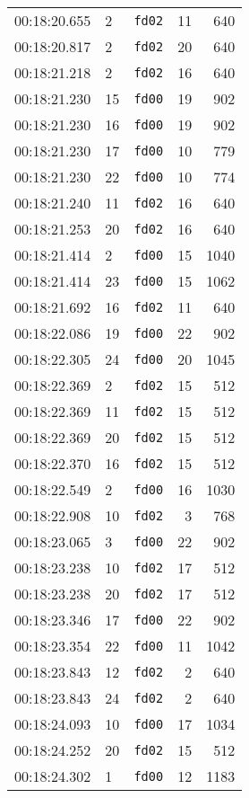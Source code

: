 \documentclass{article}
\begin{document}
\begin{longtable}{lllrr}
00:18:20.655 & 2 & \texttt{fd02} & 11 & 640 \\
00:18:20.817 & 2 & \texttt{fd02} & 20 & 640 \\
00:18:21.218 & 2 & \texttt{fd02} & 16 & 640 \\
00:18:21.230 & 15 & \texttt{fd00} & 19 & 902 \\
00:18:21.230 & 16 & \texttt{fd00} & 19 & 902 \\
00:18:21.230 & 17 & \texttt{fd00} & 10 & 779 \\
00:18:21.230 & 22 & \texttt{fd00} & 10 & 774 \\
00:18:21.240 & 11 & \texttt{fd02} & 16 & 640 \\
00:18:21.253 & 20 & \texttt{fd02} & 16 & 640 \\
00:18:21.414 & 2 & \texttt{fd00} & 15 & 1040 \\
00:18:21.414 & 23 & \texttt{fd00} & 15 & 1062 \\
00:18:21.692 & 16 & \texttt{fd02} & 11 & 640 \\
00:18:22.086 & 19 & \texttt{fd00} & 22 & 902 \\
00:18:22.305 & 24 & \texttt{fd00} & 20 & 1045 \\
00:18:22.369 & 2 & \texttt{fd02} & 15 & 512 \\
00:18:22.369 & 11 & \texttt{fd02} & 15 & 512 \\
00:18:22.369 & 20 & \texttt{fd02} & 15 & 512 \\
00:18:22.370 & 16 & \texttt{fd02} & 15 & 512 \\
00:18:22.549 & 2 & \texttt{fd00} & 16 & 1030 \\
00:18:22.908 & 10 & \texttt{fd02} & 3 & 768 \\
00:18:23.065 & 3 & \texttt{fd00} & 22 & 902 \\
00:18:23.238 & 10 & \texttt{fd02} & 17 & 512 \\
00:18:23.238 & 20 & \texttt{fd02} & 17 & 512 \\
00:18:23.346 & 17 & \texttt{fd00} & 22 & 902 \\
00:18:23.354 & 22 & \texttt{fd00} & 11 & 1042 \\
00:18:23.843 & 12 & \texttt{fd02} & 2 & 640 \\
00:18:23.843 & 24 & \texttt{fd02} & 2 & 640 \\
00:18:24.093 & 10 & \texttt{fd00} & 17 & 1034 \\
00:18:24.252 & 20 & \texttt{fd02} & 15 & 512 \\
00:18:24.302 & 1 & \texttt{fd00} & 12 & 1183 \\

\end{longtable}
\end{document}
